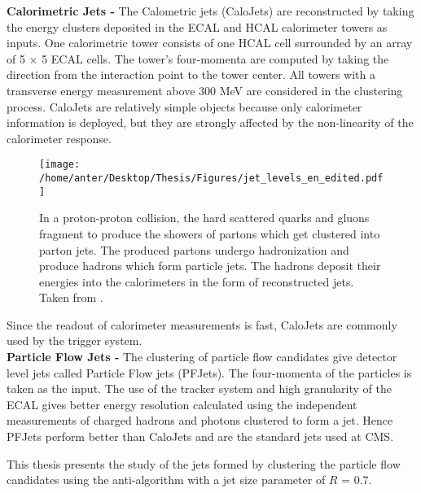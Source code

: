 {\bf Calorimetric Jets -} The Calometric jets (CaloJets) are reconstructed by taking the energy clusters deposited in the ECAL and HCAL calorimeter towers as inputs. One calorimetric tower consists of one HCAL cell surrounded by an array of 5 $\times$ 5 ECAL cells. The tower’s four-momenta are computed by taking the direction from the interaction point to the tower center. All towers with a transverse energy measurement above 300 MeV are considered in the clustering process. CaloJets are relatively simple objects because only calorimeter information is deployed, but they are strongly affected by the non-linearity of the calorimeter response. \begin{figure}[!h]
\begin{center}
\vspace*{3mm} 
\hspace*{-5mm}
\texttt{[image: /home/anter/Desktop/Thesis/Figures/jet\_levels\_en\_edited.pdf]}\\
\vspace*{4mm}
\caption[Formation of jets in a proton-proton collision at different levels.]{In a proton-proton collision, the hard scattered quarks and gluons fragment to produce the showers of partons which get clustered into parton jets. The produced partons undergo hadronization and produce hadrons which form particle jets. The hadrons deposit their energies into the calorimeters in the form of reconstructed jets. Taken from \cite{Schorner-Sadenius:2015cga}.}
\label{fig:jets}
\end{center}
\end{figure} Since the readout of calorimeter measurements is fast, CaloJets are commonly used by the trigger system. \\ \newline
{\bf Particle Flow Jets -} The clustering of particle flow candidates give detector level jets called Particle Flow jets (PFJets). The four-momenta of the particles is taken as the input. The use of the tracker system and high granularity of the ECAL gives better energy resolution calculated using the independent measurements of charged hadrons and photons clustered to form a jet. Hence PFJets perform better than CaloJets and are the standard jets used at CMS.

This thesis presents the study of the jets formed by clustering the particle flow candidates using the anti-\kt algorithm with a jet size parameter of $R$ = 0.7. 

